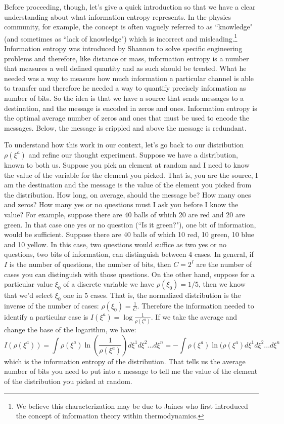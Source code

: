 \documentclass[11pt]{article}
\begin{document}
Before proceeding, though, let's give a quick introduction so that we have a clear understanding about what information entropy represents. In the physics community, for example, the concept is often vaguely referred to as ``knowledge" (and sometimes as ``lack of knowledge") which is incorrect and misleading.\footnote{We believe this characterization may be due to Jaines\cite{Jaines} who first introduced the concept of information theory within thermodynamics.} Information entropy was introduced by Shannon\cite{Shannon} to solve specific engineering problems and therefore, like distance or mass, information entropy is a number that measures a well defined quantity and as such should be treated. What he needed was a way to measure how much information a particular channel is able to transfer and therefore he needed a way to quantify precisely information as number of bits. So the idea is that we have a source that sends messages to a destination, and the message is encoded in zeros and ones. Information entropy is the optimal average number of zeros and ones that must be used to encode the messages. Below, the message is crippled and above the message is redundant.

To understand how this work in our context, let's go back to our distribution $\rho(\xi^a)$ and refine our thought experiment. Suppose we have a distribution, known to both us. Suppose you pick an element at random and I need to know the value of the variable for the element you picked. That is, you are the source, I am the destination and the message is the value of the element you picked from the distribution. How long, on average, should the message be? How many ones and zeros? How many yes or no questions must I ask you before I know the value? For example, suppose there are 40 balls of which 20 are red and 20 are green. In that case one yes or no question (``Is it green?"), one bit of information, would be sufficient. Suppose there are 40 balls of which 10 red, 10 green, 10 blue and 10 yellow. In this case, two questions would suffice as two yes or no questions, two bits of information, can distinguish between 4 cases. In general, if $I$ is the number of questions, the number of bits, then $C = 2 ^ I$ are the number of cases you can distinguish with those questions. On the other hand, suppose for a particular value $\xi_0$ of a discrete variable we have $\rho(\xi_0)=1/5$, then we know that we'd select $\xi_0$ one in 5 cases. That is, the normalized distribution is the inverse of the number of cases: $\rho(\xi_0) = \frac{1}{C}$.  Therefore the information needed to identify a particular case is $I(\xi^a)=\log \frac{1}{\rho(\xi^a)}$. If we take the average and change the base of the logarithm, we have:
\begin{equation}
I(\rho(\xi^a)) = \int \rho(\xi^a) \ln \left(\frac{1}{\rho(\xi^a)}\right) d\xi^1 d\xi^2 ... d\xi^n =-\int \rho(\xi^a) \ln (\rho(\xi^a) d\xi^1 d\xi^2 ... d\xi^n
\end{equation}
which is the information entropy of the distribution. That tells us the average number of bits you need to put into a message to tell me the value of the element of the distribution you picked at random.
\end{document}
